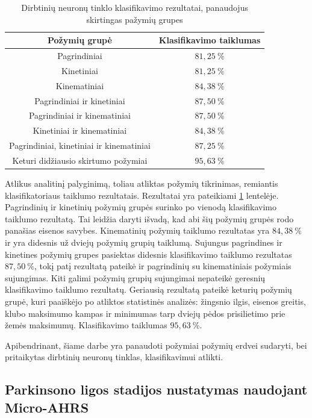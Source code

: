 \documentclass[]{vgtuef}
\begin{document}
\begin{table}
	\centering
	\renewcommand{\arraystretch}{1.3}
	\caption{Dirbtinių neuronų tinklo klasifikavimo rezultatai, panaudojus skirtingas pažymių grupes \cite{6151536}}
	\label{table:ann_table_results}
	\begin{tabular}{|c|c|} \hline
		Požymių grupė & Klasifikavimo taiklumas \\ \hline
		Pagrindiniai & $81,25~\%$ \\ \hline
		Kinetiniai & $81,25~\%$ \\ \hline
		Kinematiniai & $84,38~\%$ \\ \hline
		Pagrindiniai ir kinetiniai & $87,50~\%$ \\ \hline
		Pagrindiniai ir kinematiniai & $87,50~\%$ \\ \hline
		Kinetiniai ir kinematiniai & $84,38~\%$ \\ \hline
		Pagrindiniai, kinetiniai ir kinematiniai & $87,25~\%$ \\ \hline	
		Keturi didžiausio skirtumo požymiai & $95,63~\%$ \\ \hline	
	\end{tabular}
\end{table}

Atlikus analitinį palyginimą, toliau atliktas požymių tikrinimas, remiantis klasifikatoriaus taiklumo rezultatais. Rezultatai yra pateikiami \ref{table:ann_table_results} lentelėje. Pagrindinių ir kinetinių požymių grupės surinko po vienodą klasifikavimo taiklumo rezultatą. Tai leidžia daryti išvadą, kad abi šių požymių grupės rodo panašias eisenos savybes. Kinematinių požymių taiklumo rezultatas yra $84,38~\%$ ir yra didesnis už dviejų požymių grupių taiklumą. Sujungus pagrindines ir kinetines požymių grupes pasiektas didesnis klasifikavimo taiklumo rezultatas $87,50~\%$, tokį patį rezultatą pateikė ir pagrindinių su kinematiniais požymiais sujungimas. Kiti galimi požymių grupių sujungimai nepateikė geresnių klasifikavimo taiklumo rezultatų. Geriausią rezultatą pateikė keturių požymių grupė, kuri paaiškėjo po atliktos statistinės analizės: žingsnio ilgis, eisenos greitis, klubo maksimumo kampas ir minimumas tarp dviejų pėdos prisilietimo prie žemės maksimumų. Klasifikavimo taiklumas $95,63~\%$.

Apibendrinant, šiame darbe yra panaudoti požymiai požymių erdvei sudaryti, bei pritaikytas dirbtinių neuronų tinklas, klasifikavimui atlikti.

\subsection{Parkinsono ligos stadijos nustatymas naudojant Micro-AHRS}
\end{document}

